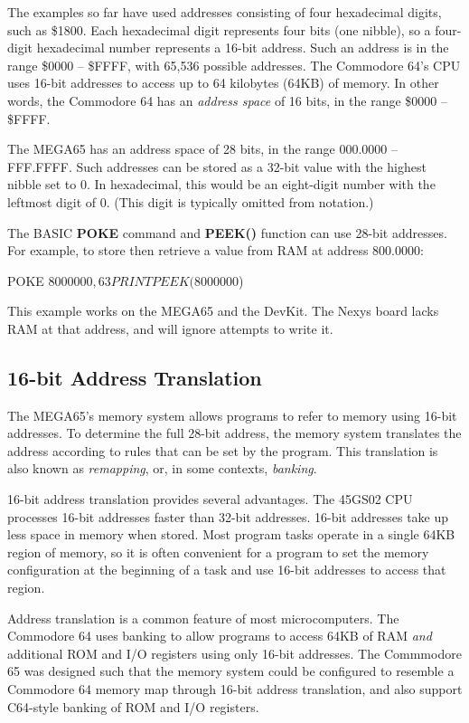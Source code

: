 The examples so far have used addresses consisting of four hexadecimal digits,
such as \$1800. Each hexadecimal digit represents four bits (one nibble), so a
four-digit hexadecimal number represents a 16-bit address. Such an address is
in the range \$0000 -- \$FFFF, with 65,536 possible addresses. The Commodore
64's CPU uses 16-bit addresses to access up to 64 kilobytes (64KB) of memory.
In other words, the Commodore 64 has an \emph{address space} of 16 bits, in the
range \$0000 -- \$FFFF.

The MEGA65 has an address space of 28 bits, in the
range 000.0000 -- FFF.FFFF. Such addresses can be stored as a 32-bit value with
the highest nibble set to 0. In hexadecimal, this would be an
eight-digit number with the leftmost digit of 0. (This digit is typically
omitted from notation.)

The BASIC {\bf POKE} command and {\bf PEEK()} function can use 28-bit
addresses. For example, to store then retrieve a value from RAM at address 800.0000:

\begin{basiccode}
POKE $8000000,63
PRINT PEEK($8000000)
\end{basiccode}

This example works on the MEGA65 and the DevKit. The Nexys board lacks RAM
at that address, and will ignore attempts to write it.

\subsection{16-bit Address Translation}

The MEGA65's memory system allows programs to refer to memory using 16-bit
addresses. To determine the full 28-bit address, the memory system translates
the address according to rules that can be set by the program. This translation
is also known as {\em remapping}, or, in some contexts, {\em banking}.

16-bit address translation provides several advantages. The 45GS02 CPU
processes 16-bit addresses faster than 32-bit addresses. 16-bit addresses take
up less space in memory when stored. Most program tasks operate in a single
64KB region of memory, so it is often convenient for a program to set the
memory configuration at the beginning of a task and use 16-bit addresses to
access that region.

Address translation is a common feature of most microcomputers. The Commodore
64 uses banking to allow programs to access 64KB of RAM {\em and} additional
ROM and I/O registers using only 16-bit addresses. The Commmodore 65 was
designed such that the memory system could be configured to resemble a
Commodore 64 memory map through 16-bit address translation, and also support
C64-style banking of ROM and I/O registers.

